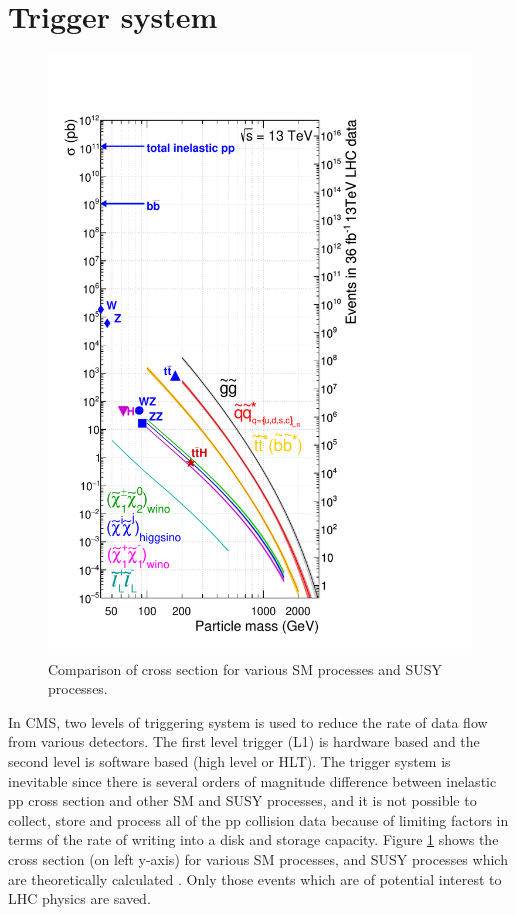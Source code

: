 \section{Trigger system}																			
\begin{figure}
\includegraphics[width=0.9\linewidth]{../Figures/Chap2/xsec13TeV_36_SM}
\captionsetup{width=.9\linewidth}
\caption[SM cross section vs SUSY cross section]{Comparison of cross section for various SM processes and SUSY processes.}\label{fig:xsec13TeV_36_SM}
\end{figure}
In CMS, two levels of triggering system is used to reduce the rate of data flow from various detectors. The first level trigger (L1) is 
hardware based and the second level is software based (high level or HLT). The trigger system is inevitable since there is several orders 
of magnitude difference between inelastic pp cross section and other SM and SUSY processes, and it is not possible to collect, store and
process all of the pp collision data because of limiting factors in terms of the rate of writing into a disk and storage capacity.
Figure \ref{fig:xsec13TeV_36_SM} shows the cross section (on left y-axis) for various SM processes, and SUSY processes which are 
theoretically calculated \cite{Borschensky:2014cia}. Only those events which are of potential interest to LHC physics are saved. 

